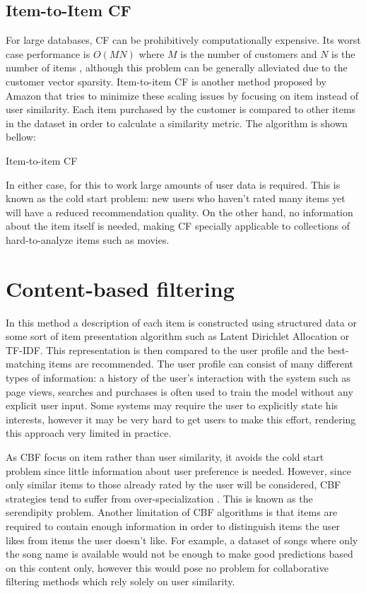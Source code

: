 \documentclass[cic,tc,english]{iiufrgs}
\begin{document}
\subsection{Item-to-Item CF}
For large databases, CF can be prohibitively computationally expensive. Its worst case performance is \(O(MN)\) where \(M\) is the number of customers and \(N\) is the number of items \cite{Linden2003}, although this problem can be generally alleviated due to the customer vector sparsity. Item-to-item CF is another method proposed by Amazon that tries to minimize these scaling issues by focusing on item instead of user similarity. Each item purchased by the customer is compared to other items in the dataset in order to calculate a similarity metric. The algorithm is shown bellow:

\begin{algorithm}[H]
 \caption{Item-to-item CF}
\end{algorithm}

In either case, for this to work large amounts of user data is required. This is known as the cold start problem: new users who haven't rated many items yet will have a reduced recommendation quality. On the other hand, no information about the item itself is needed, making CF specially applicable to collections of hard-to-analyze items such as movies.

\section{Content-based filtering}
In this method a description of each item is constructed using structured data or some sort of item presentation algorithm such as Latent Dirichlet Allocation or TF-IDF. This representation is then compared to the user profile and the best-matching items are recommended. The user profile can consist of many different types of information: a history of the user's interaction with the system such as page views, searches and purchases is often used to train the model without any explicit user input. Some systems may require the user to explicitly state his interests, however it may be very hard to get users to make this effort, rendering this approach very limited in practice.

As CBF focus on item rather than user similarity, it avoids the cold start problem since little information about user preference is needed. However, since only similar items to those already rated by the user will be considered, CBF strategies tend to suffer from over-specialization \cite{Iaquinta2008}. This is known as the serendipity problem. Another limitation of CBF algorithms is that items are required to contain enough information in order to distinguish items the user likes from items the user doesn't like. For example, a dataset of songs where only the song name is available would not be enough to make good predictions based on this content only, however this would pose no problem for collaborative filtering methods which rely solely on user similarity. 
\end{document}
